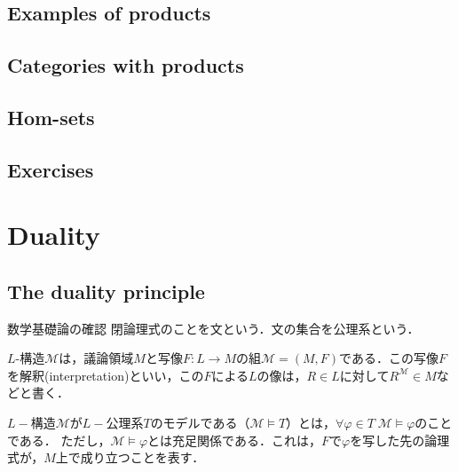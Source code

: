 \documentclass[uplatex, 12pt, dvipdfmx]{jsarticle}
\begin{document}
\subsection{Examples of products}

\begin{remark}
    
\end{remark}



\subsection{Categories with products}

\begin{definition}
    
\end{definition}

\subsection{Hom-sets}
\begin{proposition}
    
\end{proposition}

\begin{definition}
    
\end{definition}

\begin{corollary}[表現可能関手は積を保存する]\label{corollary-representable-functors-preserve-limits}
    
\end{corollary}
\subsection{Exercises}

\section{Duality}

\subsection{The duality principle}

\begin{itembox}[l]{数学基礎論の確認}
    閉論理式のことを文という．文の集合を公理系という．

    $L$-構造$\mathcal{M}$は，議論領域$M$と写像$F:L\to M$の組$\mathcal{M}=(M,F)$である．この写像$F$を解釈(interpretation)といい，この$F$による$L$の像は，$R\in L$に対して$R^\mathcal{M}\in M$などと書く．

    $L-$構造$\mathcal{M}$が$L-$公理系$T$のモデルである（$\mathcal{M}\models T$）とは，$\forall\varphi\in T\; \mathcal{M}\models \varphi$のことである．
    ただし，$\mathcal{M}\models\varphi$とは充足関係である．これは，$F$で$\varphi$を写した先の論理式が，$M$上で成り立つことを表す．
\end{itembox}
\end{document}
